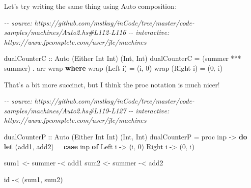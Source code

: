 \documentclass[]{article}
\newenvironment{Shaded}{}{}
\newcommand{\CommentTok}[1]{\textcolor[rgb]{0.38,0.63,0.69}{\textit{#1}}}
\newcommand{\DataTypeTok}[1]{\textcolor[rgb]{0.56,0.13,0.00}{#1}}
\newcommand{\DecValTok}[1]{\textcolor[rgb]{0.25,0.63,0.44}{#1}}
\newcommand{\FunctionTok}[1]{\textcolor[rgb]{0.02,0.16,0.49}{#1}}
\newcommand{\KeywordTok}[1]{\textcolor[rgb]{0.00,0.44,0.13}{\textbf{#1}}}
\newcommand{\NormalTok}[1]{#1}
\newcommand{\OperatorTok}[1]{\textcolor[rgb]{0.40,0.40,0.40}{#1}}
\newcommand{\OtherTok}[1]{\textcolor[rgb]{0.00,0.44,0.13}{#1}}
\begin{document}
Let's try writing the same thing using Auto composition:

\begin{Shaded}
\begin{Highlighting}[]
\CommentTok{{-}{-} source: https://github.com/mstksg/inCode/tree/master/code{-}samples/machines/Auto2.hs\#L112{-}L116}
\CommentTok{{-}{-} interactive: https://www.fpcomplete.com/user/jle/machines}

\OtherTok{dualCounterC ::} \DataTypeTok{Auto}\NormalTok{ (}\DataTypeTok{Either} \DataTypeTok{Int} \DataTypeTok{Int}\NormalTok{) (}\DataTypeTok{Int}\NormalTok{, }\DataTypeTok{Int}\NormalTok{)}
\NormalTok{dualCounterC }\OtherTok{=}\NormalTok{ (summer }\OperatorTok{***}\NormalTok{ summer) }\OperatorTok{.}\NormalTok{ arr wrap}
  \KeywordTok{where}
\NormalTok{    wrap (}\DataTypeTok{Left}\NormalTok{ i)  }\OtherTok{=}\NormalTok{ (i, }\DecValTok{0}\NormalTok{)}
\NormalTok{    wrap (}\DataTypeTok{Right}\NormalTok{ i) }\OtherTok{=}\NormalTok{ (}\DecValTok{0}\NormalTok{, i)}
\end{Highlighting}
\end{Shaded}

That's a bit more succinct, but I think the proc notation is much nicer!

\begin{Shaded}
\begin{Highlighting}[]
\CommentTok{{-}{-} source: https://github.com/mstksg/inCode/tree/master/code{-}samples/machines/Auto2.hs\#L119{-}L127}
\CommentTok{{-}{-} interactive: https://www.fpcomplete.com/user/jle/machines}

\OtherTok{dualCounterP ::} \DataTypeTok{Auto}\NormalTok{ (}\DataTypeTok{Either} \DataTypeTok{Int} \DataTypeTok{Int}\NormalTok{) (}\DataTypeTok{Int}\NormalTok{, }\DataTypeTok{Int}\NormalTok{)}
\NormalTok{dualCounterP }\OtherTok{=}\NormalTok{ proc inp }\OtherTok{{-}\textgreater{}} \KeywordTok{do}
    \KeywordTok{let}\NormalTok{ (add1, add2) }\OtherTok{=} \KeywordTok{case}\NormalTok{ inp }\KeywordTok{of} \DataTypeTok{Left}\NormalTok{ i  }\OtherTok{{-}\textgreater{}}\NormalTok{ (i, }\DecValTok{0}\NormalTok{)}
                                   \DataTypeTok{Right}\NormalTok{ i }\OtherTok{{-}\textgreater{}}\NormalTok{ (}\DecValTok{0}\NormalTok{, i)}

\NormalTok{    sum1 }\OtherTok{\textless{}{-}}\NormalTok{ summer }\OperatorTok{{-}\textless{}}\NormalTok{ add1}
\NormalTok{    sum2 }\OtherTok{\textless{}{-}}\NormalTok{ summer }\OperatorTok{{-}\textless{}}\NormalTok{ add2}

    \FunctionTok{id} \OperatorTok{{-}\textless{}}\NormalTok{ (sum1, sum2)}
\end{Highlighting}
\end{Shaded}
\end{document}
